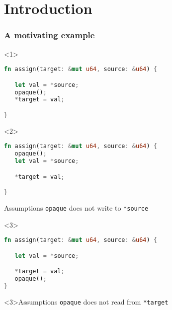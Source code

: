 \begin{frame}
    \titlepage
\end{frame}

\section{Introduction}

\begin{frame}[fragile,t]
    \frametitle{A motivating example}
    \begin{onlyenv}<1>
        \begin{block}{}
            \begin{minipage}{\textwidth}
                \begin{lstlisting}[language=rust]
fn assign(target: &mut u64, source: &u64) {

   let val = *source;
   opaque();
   *target = val;

}
                \end{lstlisting}
            \end{minipage}
        \end{block}
    \end{onlyenv}

    \begin{onlyenv}<2>
        \begin{block}{}
            \begin{minipage}{\textwidth}
                \begin{lstlisting}[language=rust, escapechar=!]
fn assign(target: &mut u64, source: &u64) {
   opaque();
   let val = *source;

   *target = val;

}
                \end{lstlisting}
            \end{minipage}
        \end{block}
        \begin{block}{Assumptions}
            \texttt{opaque} does not write to \texttt{*source}
        \end{block}
    \end{onlyenv}

    \begin{onlyenv}<3>
        \begin{block}{}
            \begin{minipage}{\textwidth}
                \begin{lstlisting}[language=rust, escapechar=!]
fn assign(target: &mut u64, source: &u64) {

   let val = *source;

   *target = val;
   opaque();
}
                \end{lstlisting}
            \end{minipage}
        \end{block}
        \begin{block}<3>{Assumptions}
            \texttt{opaque} does not read from \texttt{*target}
        \end{block}
    \end{onlyenv}
\end{frame}

